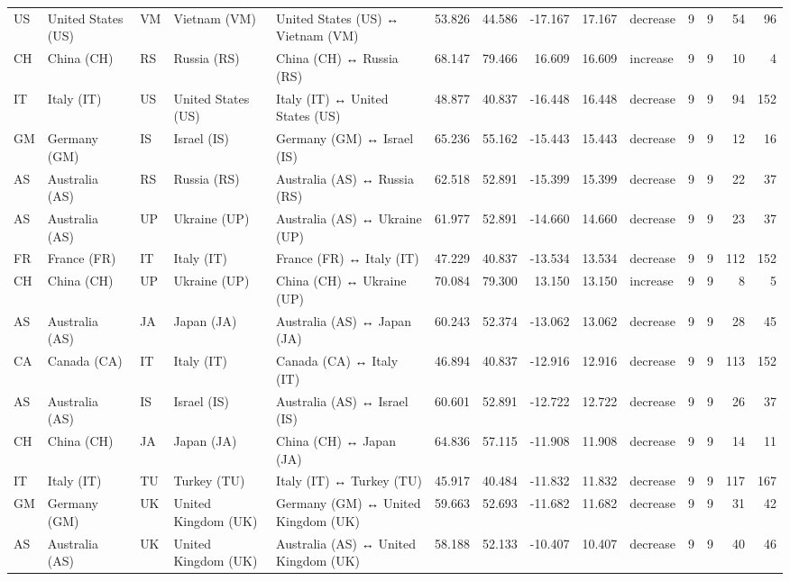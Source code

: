 \begin{tabular}{lllllrrrrlrrrr}
US & United States (US) & VM & Vietnam (VM) & United States (US) ↔ Vietnam (VM) & 53.826 & 44.586 & -17.167 & 17.167 & decrease & 9 & 9 & 54 & 96 \\
CH & China (CH) & RS & Russia (RS) & China (CH) ↔ Russia (RS) & 68.147 & 79.466 & 16.609 & 16.609 & increase & 9 & 9 & 10 & 4 \\
IT & Italy (IT) & US & United States (US) & Italy (IT) ↔ United States (US) & 48.877 & 40.837 & -16.448 & 16.448 & decrease & 9 & 9 & 94 & 152 \\
GM & Germany (GM) & IS & Israel (IS) & Germany (GM) ↔ Israel (IS) & 65.236 & 55.162 & -15.443 & 15.443 & decrease & 9 & 9 & 12 & 16 \\
AS & Australia (AS) & RS & Russia (RS) & Australia (AS) ↔ Russia (RS) & 62.518 & 52.891 & -15.399 & 15.399 & decrease & 9 & 9 & 22 & 37 \\
AS & Australia (AS) & UP & Ukraine (UP) & Australia (AS) ↔ Ukraine (UP) & 61.977 & 52.891 & -14.660 & 14.660 & decrease & 9 & 9 & 23 & 37 \\
FR & France (FR) & IT & Italy (IT) & France (FR) ↔ Italy (IT) & 47.229 & 40.837 & -13.534 & 13.534 & decrease & 9 & 9 & 112 & 152 \\
CH & China (CH) & UP & Ukraine (UP) & China (CH) ↔ Ukraine (UP) & 70.084 & 79.300 & 13.150 & 13.150 & increase & 9 & 9 & 8 & 5 \\
AS & Australia (AS) & JA & Japan (JA) & Australia (AS) ↔ Japan (JA) & 60.243 & 52.374 & -13.062 & 13.062 & decrease & 9 & 9 & 28 & 45 \\
CA & Canada (CA) & IT & Italy (IT) & Canada (CA) ↔ Italy (IT) & 46.894 & 40.837 & -12.916 & 12.916 & decrease & 9 & 9 & 113 & 152 \\
AS & Australia (AS) & IS & Israel (IS) & Australia (AS) ↔ Israel (IS) & 60.601 & 52.891 & -12.722 & 12.722 & decrease & 9 & 9 & 26 & 37 \\
CH & China (CH) & JA & Japan (JA) & China (CH) ↔ Japan (JA) & 64.836 & 57.115 & -11.908 & 11.908 & decrease & 9 & 9 & 14 & 11 \\
IT & Italy (IT) & TU & Turkey (TU) & Italy (IT) ↔ Turkey (TU) & 45.917 & 40.484 & -11.832 & 11.832 & decrease & 9 & 9 & 117 & 167 \\
GM & Germany (GM) & UK & United Kingdom (UK) & Germany (GM) ↔ United Kingdom (UK) & 59.663 & 52.693 & -11.682 & 11.682 & decrease & 9 & 9 & 31 & 42 \\
AS & Australia (AS) & UK & United Kingdom (UK) & Australia (AS) ↔ United Kingdom (UK) & 58.188 & 52.133 & -10.407 & 10.407 & decrease & 9 & 9 & 40 & 46 \\

\end{tabular}

